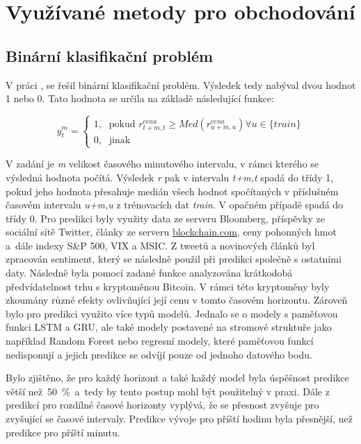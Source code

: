 \section{Využívané metody pro obchodování}

\subsection{Binární klasifikační problém}

V práci  \cite{bkp}, se řešil binární klasifikační problém.
Výsledek tedy nabýval dvou hodnot 1 nebo 0.
Tato hodnota se určila na základě následující funkce:

\[y_{t}^{m} = \begin{cases} \mbox{1,} & \mbox{pokud } r_{t+m,t}^{cena} \geq Med(r_{u+m,u}^{cena})\forall u \in \{train\} \\ \mbox{0,} & \mbox{jinak} \end{cases}\]

V zadání je \textit{m} velikost časového minutového intervalu, v rámci kterého se výsledná hodnota počítá. 
Výsledek \textit{r} pak v intervalu \textit{t+m,t} spadá do třídy 1, pokud jeho hodnota přesahuje medián všech hodnot spočítaných v příslušném časovém intervalu \textit{u+m,u} z trénovacích dat \textit{train}. 
V opačném případě spadá do třídy 0. 
Pro predikci byly využity data ze serveru Bloomberg, příspěvky ze sociální sítě Twitter, články ze serveru \url{blockchain.com}, ceny pohonných hmot a~dále indexy S\&P 500, VIX a MSIC.
Z tweetů a novinových článků byl zpracován sentiment, který se následně použil při predikci společně s ostatními daty. 
Následně byla pomocí zadané funkce analyzována krátkodobá předvídatelnost trhu s kryptoměnou Bitcoin. 
V rámci této kryptoměny byly zkoumány různé efekty ovlivňující její cenu v tomto časovém horizontu. 
Zároveň bylo pro predikci využito více typů modelů. 
Jednalo se o modely s paměťovou funkci LSTM a GRU, ale také modely postavené na stromové struktuře jako například Random Forest nebo regresní modely, které paměťovou funkcí nedisponují a jejich predikce se odvíjí pouze od jednoho datového bodu.

Bylo zjištěno, že pro každý horizont a také každý model byla úspěšnost predikce větší než~50~\%~a~tedy by tento postup mohl být použitelný v praxi. 
Dále z predikcí pro rozdílné časové horizonty vyplývá, že se přesnost zvyšuje pro zvyšující se časové intervaly. 
Predikce vývoje pro příští hodinu byla přesnější, než predikce pro příští minutu. 

